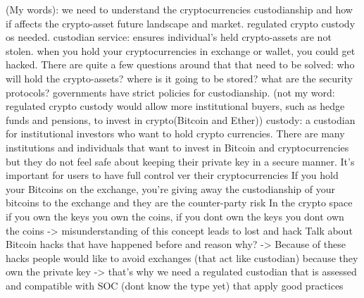 (My words):
we need to understand the cryptocurrencies custodianship and how if affects the crypto-asset future landscape and market. 
regulated crypto custody os needed.
custodian service: ensures individual's held crypto-assets are not stolen.
when you hold your cryptocurrencies in exchange or wallet, you could get hacked.
There are quite a few questions around that that need to be solved: who will hold the crypto-assets? where is it going to be stored? what are the  security protocols? governments have strict policies for custodianship.
 (not my word: regulated crypto custody would allow more institutional buyers, such as hedge funds and pensions, to invest in crypto(Bitcoin and Ether))
custody: a custodian for institutional investors who want to hold crypto currencies.
There are many institutions and individuals that want to invest in Bitcoin and cryptocurrencies but they do not feel safe about keeping their private key in a secure manner.
It's important for users to have full control ver their cryptocurrencies
If you hold your Bitcoins on the exchange, you're giving away the custodianship of your bitcoins to the exchange and they are the counter-party risk
In the crypto space if you own the keys you own the coins, if you dont own the keys you dont own the coins -> misunderstanding of this concept leads to lost and hack
Talk about Bitcoin hacks that have happened before and reason why? -> Because of these hacks people would like to avoid exchanges (that act like custodian) because they own the private key -> that's why we need a regulated custodian that is assessed and compatible with SOC (dont know the type yet) that apply good practices












\nocite{*}
